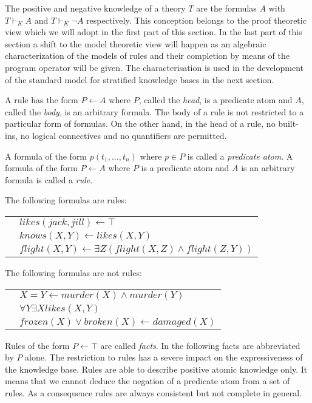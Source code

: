 The positive and negative knowledge of a theory $T$ are the formulas $A$ with $T \vdash_K A$ 
and $T \vdash_K \neg A$ respectively. This conception belongs to the proof theoretic view which
we will adopt in the first part of this section. In the last part of this section a shift to the 
model theoretic view will happen as an algebraic characterization of the models of rules and their 
completion by means of the program operator will be given. The characterisation is used in the 
development of the standard model for stratified knowledge bases in the next section.

A rule has the form $P \leftarrow A$ where $P$, called the {\em head}, is a predicate atom and $A$, 
called the {\em body}, is an arbitrary formula. The body of a rule is not restricted to a particular
form of formulas. On the other hand, in the head of a rule, no built-ins, no logical connectives and 
no quantifiers are permitted. 

\begin{Def} A formula of the form $p(t_1,\ldots,t_n)$ where $p \in P$ is called a {\em predicate 
atom}. A formula of the form $P \leftarrow A$ where $P$ is a predicate atom and $A$ is an
arbitrary formula is called a {\em rule}.
\end{Def}

\begin{Bsp} The following formulas are rules:

\begin{tabular}{ll}
\quad & $likes(jack,jill) \leftarrow \top$ \\
\quad & $knows(X,Y) \leftarrow likes(X,Y)$ \\
\quad & $flight(X,Y) \leftarrow \exists Z(flight(X,Z) \wedge flight(Z,Y))$
\end{tabular}

The following formulas are not rules:

\begin{tabular}{ll}
\quad & $X=Y \leftarrow murder(X) \wedge murder(Y)$ \\
\quad & $\forall Y \exists X likes(X,Y)$ \\
\quad & $frozen(X) \vee broken(X) \leftarrow damaged(X)$
\end{tabular} 
\end{Bsp}

Rules of the form $P \leftarrow \top$ are called {\em facts}. In the following facts are 
abbreviated by $P$ alone. The restriction to rules has a severe impact on the expressiveness 
of the knowledge base. Rules are able to describe positive atomic knowledge only. It means 
that we cannot deduce the negation of a predicate atom from a set of rules. As a consequence 
rules are always consistent but not complete in general.

